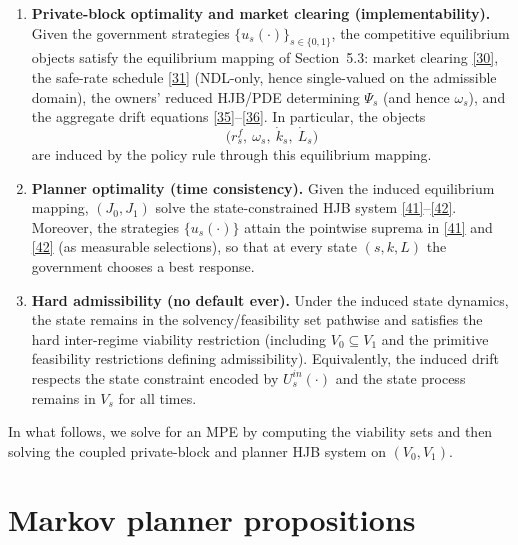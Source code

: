 \documentclass{article}
\begin{document}
\begin{enumerate}
\item[(i)] \textbf{Private-block optimality and market clearing (implementability).}
Given the government strategies $\{u_s(\cdot)\}_{s\in\{0,1\}}$, the competitive equilibrium objects satisfy the equilibrium mapping of Section~5.3: market clearing \eqref{30}, the safe-rate schedule \eqref{31} (NDL-only, hence single-valued on the admissible domain), the owners' reduced HJB/PDE determining $\Psi_s$ (and hence $\omega_s$), and the aggregate drift equations \eqref{35}--\eqref{36}. In particular, the objects
\[
\big(r^f_s,\ \omega_s,\ \dot k_s,\ \dot L_s\big)
\]
are induced by the policy rule through this equilibrium mapping.

\item[(ii)] \textbf{Planner optimality (time consistency).}
Given the induced equilibrium mapping, $(J_0,J_1)$ solve the state-constrained HJB system \eqref{41}--\eqref{42}. Moreover, the strategies $\{u_s(\cdot)\}$ attain the pointwise suprema in \eqref{41} and \eqref{42} (as measurable selections), so that at every state $(s,k,L)$ the government chooses a best response.

\item[(iii)] \textbf{Hard admissibility (no default ever).}
Under the induced state dynamics, the state remains in the solvency/feasibility set pathwise and satisfies the hard inter-regime viability restriction (including $V_0\subseteq V_1$ and the primitive feasibility restrictions defining admissibility). Equivalently, the induced drift respects the state constraint encoded by $U^{in}_s(\cdot)$ and the state process remains in $V_s$ for all times.
\end{enumerate}

In what follows, we solve for an MPE by computing the viability sets and then solving the coupled private-block and planner HJB system on $(V_0,V_1)$.

\section{Markov planner propositions}

\end{document}
